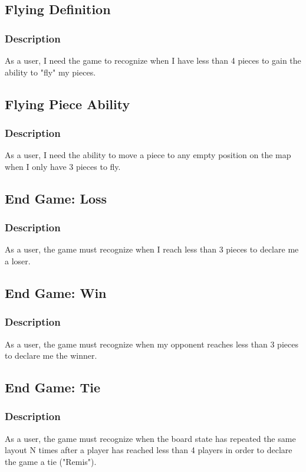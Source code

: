 \documentclass[11pt]{article}
\begin{document}
\subsection{Flying Definition}
\label{sec:org488bf16}
\subsubsection*{Description}
\label{sec:orgd91cbfa}
As a user, I need the game to recognize when I have less than 4 pieces to gain the ability to
"fly" my pieces.

\subsection{Flying Piece Ability}
\label{sec:orgf90a935}
\subsubsection*{Description}
\label{sec:org0125f5e}
As a user, I need the ability to move a piece to any empty position on the map when I only have
3 pieces to fly.

\subsection{End Game: Loss}
\label{sec:org62411b7}
\subsubsection*{Description}
\label{sec:orgdd5d86b}
As a user, the game must recognize when I reach less than 3 pieces to declare me a loser.

\subsection{End Game: Win}
\label{sec:org32956f8}
\subsubsection*{Description}
\label{sec:orgf8e9c71}
As a user, the game must recognize when my opponent reaches less than 3 pieces to declare me the
winner.

\subsection{End Game: Tie}
\label{sec:orgbe95978}
\subsubsection*{Description}
\label{sec:org6c703ce}
As a user, the game must recognize when the board state has repeated the same layout N times
after a player has reached less than 4 players in order to declare the game a tie ("Remis").
\end{document}
